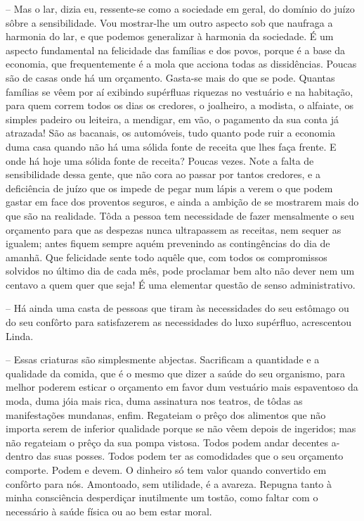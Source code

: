 \documentclass[9pt]{article}
\begin{document}
-- Mas o lar, dizia eu, ressente-se como a sociedade em geral, do
domínio do juízo sôbre a sensibilidade. Vou mostrar-\-lhe um outro aspecto sob que naufraga a harmonia do lar, e que podemos generalizar
à harmonia da sociedade. É um aspecto fundamental na felicidade das
fa\-mí\-lias e dos povos, porque é a base da economia, que frequentemente é
a mola que acciona todas as dissidên\-cias. Poucas são de casas onde
há um or\-ça\-men\-to. Gasta-se mais do que se pode. Quantas fa\-mí\-lias se
vêem por aí exibindo supérfluas riquezas no vestuário e na habita\-ção,
para quem correm todos os dias os credores, o joa\-lheiro, a modista, o
alfaiate, os simples padeiro ou leiteira, a mendigar, em vão, o pagamento
da sua conta já atrazada! São as bacanais, os automóveis, tudo quanto
pode ruir a economia duma casa quan\-do não há uma sólida fonte de receita que lhes faça frente. E onde há hoje uma sólida fonte de receita?
Poucas vezes. Note a falta de sensibilidade dessa gente, que não cora
ao passar por tantos credores, e a deficiência de juízo que os impede
de pegar num lápis a verem o que podem gastar em face dos proventos
seguros, e ainda a ambi\-ção de se mostrarem mais do que são na realidade.
Tôda a pessoa tem necessidade de fazer mensalmente o seu or\-ça\-men\-to
para que as despezas nunca ultrapassem as receitas, nem sequer as
igualem; antes fiquem sempre aquém prevenindo as contingências do dia
de a\-ma\-nhã. Que felicidade sente todo a\-quê\-le que, com todos os compromissos solvidos no último dia de cada mês, pode proclamar bem alto
não dever nem um centavo a quem quer que seja! É uma elementar questão de senso administrativo.

-- Há ainda uma casta de pessoas que tiram às necessidades do seu
estômago ou do seu con\-fôr\-to para satisfazerem as necessidades do luxo
supérfluo, acrescentou Linda.

-- Essas criaturas são simplesmente abjectas. Sacrifi\-cam a quantidade e a qualidade da comida, que é o mesmo que dizer a saúde do
seu organismo, para me\-lhor poderem esticar o or\-ça\-men\-to em favor dum
vestuário mais espaventoso da moda, duma jóia mais rica, duma assinatura nos teatros, de
tôdas as manifesta\-ções mundanas, enfim. Regateiam o prêço dos alimentos que não importa serem de inferior qualidade porque se não vêem
depois de ingeridos; mas não regateiam o prêço da sua pompa vistosa.
Todos podem andar decentes a-dentro das suas posses. Todos podem ter
as comodidades que o seu or\-ça\-men\-to comporte. Podem e devem. O dinheiro só tem valor quan\-do convertido em con\-fôr\-to para nós. Amontoado,
sem utilidade, é a avareza. Repugna tanto à minha consciência des\-per\-di\-çar
inutilmente um tostão, como faltar com o necessário à saúde física ou ao
bem estar moral.
\end{document}
